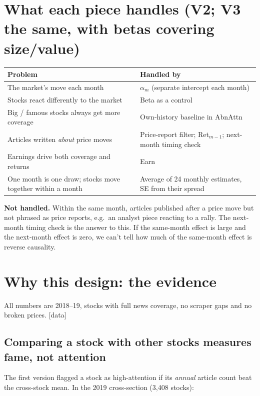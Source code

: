 \documentclass[11pt]{article}
\newcommand{\data}{\textcolor{NavyBlue}{\textsf{[data]}}}
\begin{document}
\section{What each piece handles (V2; V3 the same, with betas covering size/value)}

\begin{center}
\begin{tabularx}{\textwidth}{>{\raggedright}p{6.2cm} >{\raggedright\arraybackslash}X}
\toprule
Problem & Handled by\\
\midrule
The market's move each month & $\alpha_m$ (separate intercept each month)\\
Stocks react differently to the market & Beta as a control\\
Big / famous stocks always get more coverage & Own-history baseline in AbnAttn\\
Articles written \emph{about} price moves & Price-report filter; Ret$_{m-1}$; next-month timing check\\
Earnings drive both coverage and returns & Earn\\
One month is one draw; stocks move together within a month & Average of 24 monthly estimates, SE from their spread\\
\bottomrule
\end{tabularx}
\end{center}

\textbf{Not handled.} Within the same month, articles published after a price move but not phrased as price reports, e.g.\ an analyst piece reacting to a rally. The next-month timing check is the answer to this. If the same-month effect is large and the next-month effect is zero, we can't tell how much of the same-month effect is reverse causality.

\section{Why this design: the evidence}\label{sec:why}

All numbers are 2018--19, stocks with full news coverage, no scraper gaps and no broken prices. \data{}

\subsection{Comparing a stock with other stocks measures fame, not attention}
The first version flagged a stock as high-attention if its \emph{annual} article count beat the cross-stock mean. In the 2019 cross-section (3{,}408 stocks):
\end{document}
